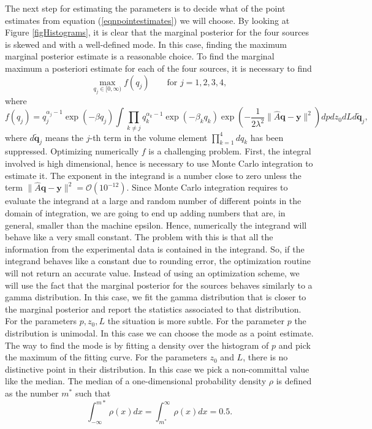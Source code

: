 \documentclass[12pt]{book}
\newcommand{\q}{\textbf{q}}
\newcommand{\pars}{p,z_{0},L}
\newcommand{\y}{\textbf{y}}
\begin{document}
The next step for estimating the parameters is to decide what of the point estimates from equation (\ref{eqnpointestimates})
we will choose. By looking at Figure \ref{figHistograms},
it is clear that the  marginal posterior for the four sources is skewed and with a well-defined mode.
In this case, finding the maximum marginal posterior estimate is a reasonable choice. 
To find the  marginal maximum a posteriori estimate for  each of the four sources, it is
necessary to find
\begin{equation*}
\max_{q_{j}\in [0,\infty)}f(q_{j})\qquad\text{for } j=1,2,3,4,
\end{equation*}
where
\begin{equation*}
f(q_{j})=q_{j}^{\alpha_{j}-1}\exp(-\beta q_{j})\int \prod_{k\neq j}q_{k}^{\alpha_{k}-1}\exp(-\beta_{k}q_{k})
\exp\left(-\frac{1}{2\lambda^{2}}\|\widehat{A}\q-\y\|^{2}\right)dpdz_{0}dLd\tilde{\q}_{j},
\end{equation*}
where $d\tilde{\q}_{j}$ means the $j$-th term in the volume element $\prod_{k=1}^{4}dq_{k}$ has been suppressed.
Optimizing numerically $f$ is a challenging problem. 
First, the integral involved is high dimensional,
hence is necessary to use Monte Carlo integration to estimate it.  
The exponent in the integrand is a number close to zero
unless the term $\|\widehat{A}\q-\y\|^{2}=\mathcal{O}(10^{-12})$. 
Since Monte Carlo integration requires to evaluate the integrand
at a large and random number of different points in the domain of integration, we are going
to end up adding numbers that are, in general, smaller than the machine epsilon. 
Hence, numerically
the integrand will behave like a very small constant. The problem with this is that
all the information from the experimental data is contained in the integrand. So,
if the integrand behaves like a constant due to rounding error, the optimization
routine will not return an accurate value. Instead of using an optimization scheme, 
we will use the fact that the marginal 
posterior for the sources behaves similarly to a gamma distribution. In this case, we 
fit the gamma distribution that is closer to the marginal posterior and report
the statistics associated to that distribution. 
\\
For the parameters $\pars$ the situation is more subtle. For the parameter $p$
the distribution is unimodal. 
In this case we can choose the  mode as a point estimate.
The way to find the mode is by fitting a density over the histogram
of $p$ and pick the maximum of the fitting curve.
For the parameters $z_{0}$ and $L$, there is no distinctive point in
their distribution. In this case we pick a non-committal value like 
the median. The median of a one-dimensional probability density $\rho$ is defined
as the number $m^{*}$ such that 
\begin{equation*}
\int_{-\infty}^{m*}\rho(x)dx=\int_{m^{*}}^{\infty}\rho(x)dx=0.5.
\end{equation*}
\end{document}
